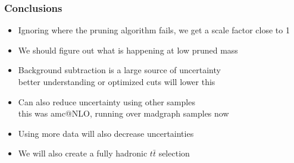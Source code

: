 \documentclass{beamer}
\begin{document}
\begin{frame}
  \frametitle{Conclusions}
  \begin{itemize}
  \item Ignoring where the pruning algorithm fails, we get a scale factor close to 1
  \item We should figure out what is happening at low pruned mass
  \item Background subtraction is a large source of uncertainty \\
    better understanding or optimized cuts will lower this
  \item Can also reduce uncertainty using other samples \\
    this was amc@NLO, running over madgraph samples now
  \item Using more data will also decrease uncertainties
  \item We will also create a fully hadronic $t\bar{t}$ selection
  \end{itemize}
\end{frame}
\end{document}
